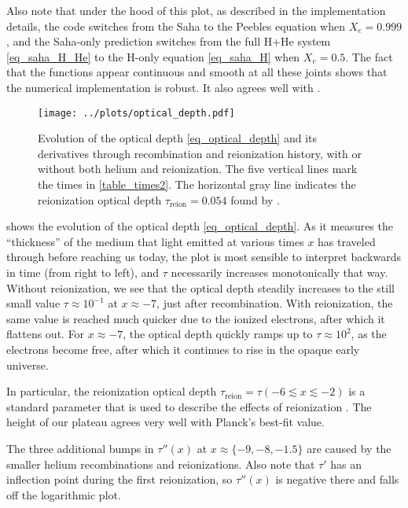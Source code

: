 \documentclass[10pt,a4paper]{article}
\begin{document}
Also note that under the hood of this plot, as described in the implementation details,
the code switches from the Saha to the Peebles equation when $X_e = 0.999$,
and the Saha-only prediction switches from the full H+He system \eqref{eq_saha_H_He} to the H-only equation \eqref{eq_saha_H} when $X_e = 0.5$.
The fact that the functions appear continuous and smooth at all these joints shows that the numerical implementation is robust.
It also agrees well with \cite[\textsc{fig. 1}]{callinHowCalculateCMB2006}.

\begin{figure}
	\centering
	\texttt{[image: ../plots/optical\_depth.pdf]}
	\caption{%
		Evolution of the optical depth \eqref{eq_optical_depth} and its derivatives through recombination and reionization history, with or without both helium and reionization.
		The five vertical lines mark the times in \cref{table_times2}.
		The horizontal gray line indicates the reionization optical depth $\tau_\text{reion}=0.054$ found by \cite{planckcollaborationPlanck2018Results2020}.
	}
	\label{fig_optical_depth}
\end{figure}

 shows the evolution of the optical depth \eqref{eq_optical_depth}.
As it measures the ``thickness'' of the medium that light emitted at various times $x$ has traveled through before reaching us today,
the plot is most sensible to interpret backwards in time (from right to left), and $\tau$ necessarily increases monotonically that way.
Without reionization, we see that the optical depth steadily increases to the still small value $\tau \approx 10^{-1}$ at $x \approx -7$, just after recombination.
With reionization, the same value is reached much quicker due to the ionized electrons, after which it flattens out.
For $x \approx -7$, the optical depth quickly ramps up to $\tau \approx 10^{2}$, as the electrons become free,
after which it continues to rise in the opaque early universe.

In particular, the reionization optical depth $\tau_\text{reion} = \tau(-6 \lesssim x \lesssim -2)$
is a standard parameter that is used to describe the effects of reionization \cite[section 9.7]{dodelsonModernCosmology2021}.
The height of our plateau agrees very well with Planck's best-fit value.

The three additional bumps in $\tau''(x)$ at $x \approx \{-9, -8, -1.5\}$ are caused by the smaller helium recombinations and reionizations.
Also note that $\tau'$ has an inflection point during the first reionization,
so $\tau''(x)$ is negative there and falls off the logarithmic plot.
\end{document}
